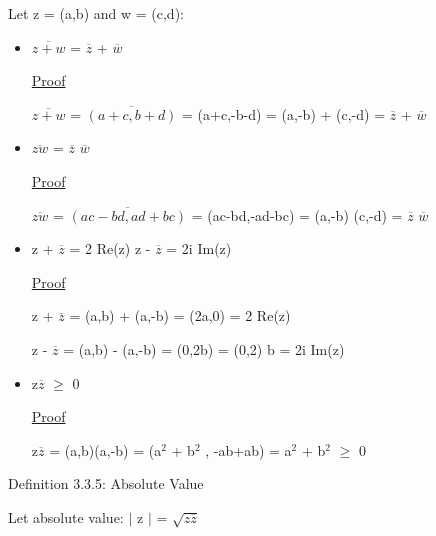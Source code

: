 	\qquad Let z = (a,b) and w = (c,d):
	\begin{itemize}[leftmargin=2cm]
		\item $\overline{z+w}$ = $\overline{z}$ + $\overline{w}$

			{ \color{magenta} \underline{Proof} } 
			
			$\overline{z+w}$ = $\overline{(a+c,b+d)}$ = (a+c,-b-d)
			= (a,-b) + (c,-d) = $\overline{z}$ + $\overline{w}$

		\item $\overline{zw}$ = $\overline{z}$ $\overline{w}$

			{ \color{magenta} \underline{Proof} } 
			
			$\overline{zw}$ = $\overline{(ac-bd,ad+bc)}$ = (ac-bd,-ad-bc)
			= (a,-b) (c,-d) = $\overline{z}$ $\overline{w}$

		\item z + $\overline{z}$ = 2 Re(z) \qquad \qquad z - $\overline{z}$ = 2i Im(z)

			{ \color{magenta} \underline{Proof} } 
			
			z + $\overline{z}$ = (a,b) + (a,-b) = (2a,0) = 2 Re(z)

			z - $\overline{z}$ = (a,b) - (a,-b) = (0,2b) = (0,2) b = 2i Im(z)

		\item z$\overline{z}$ $\geq$ 0

			{ \color{magenta} \underline{Proof} } 
			
			z$\overline{z}$ = (a,b)(a,-b) = (a$^2$ + b$^2$ , -ab+ab) = a$^2$ + b$^2$ $\geq$ 0
	\end{itemize}

	{ \color{blue} Definition 3.3.5: Absolute Value } 
	
	\qquad Let absolute value: $|$ z $|$ = $\sqrt{z \overline{z}}$ \\

